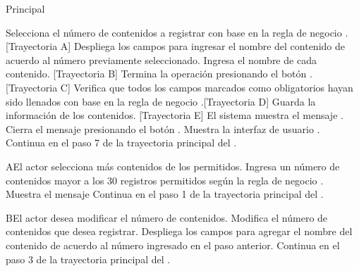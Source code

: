 \begin{UCtrayectoria}{Principal}

    \UCpaso[\UCactor] Selecciona el número de contenidos a registrar con base en la regla de negocio . [Trayectoria A]
    \UCpaso Despliega los campos para ingresar el nombre del  contenido de acuerdo al número previamente seleccionado.
    \UCpaso[\UCactor] Ingresa el nombre de cada contenido. [Trayectoria B]
    \UCpaso[\UCactor] Termina la operación presionando el botón . [Trayectoria C]
    \UCpaso Verifica que todos los campos marcados como obligatorios hayan sido llenados con base en la regla de negocio .[Trayectoria D]
    \UCpaso Guarda la información de los contenidos. [Trayectoria E]
    \UCpaso El sistema muestra el mensaje .
    \UCpaso[\UCactor] Cierra el mensaje presionando el botón .
    \UCpaso Muestra la interfaz de usuario .
    \UCpaso Continua en el paso 7 de la trayectoria principal del .
\end{UCtrayectoria}


\begin{UCtrayectoriaA}{A}{El actor selecciona más contenidos de los permitidos.}
    \UCpaso[\UCactor] Ingresa un número de contenidos mayor a los 30 registros permitidos según la regla de negocio . 
    \UCpaso Muestra el mensaje 
    \UCpaso Continua en el paso 1 de la trayectoria principal del .
\end{UCtrayectoriaA}


\begin{UCtrayectoriaA}{B}{El actor desea modificar el número de contenidos.}
    \UCpaso[\UCactor] Modifica el número de contenidos que desea registrar. 
    \UCpaso Despliega los campos para agregar el nombre del contenido de acuerdo al número ingresado en el paso anterior.
    \UCpaso Continua en el paso 3 de la trayectoria principal del .
\end{UCtrayectoriaA}

